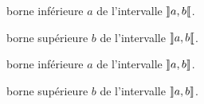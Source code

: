 \documentclass[12pt,a4paper]{article}
\begin{document}


 borne inférieure $a$ de l'intervalle $\ZintervalO{a}{b}$.

 borne supérieure $b$ de l'intervalle $\ZintervalO{a}{b}$.


\separation




 borne inférieure $a$ de l'intervalle $\ZintervalOC{a}{b}$.

 borne supérieure $b$ de l'intervalle $\ZintervalOC{a}{b}$.

\end{document}
